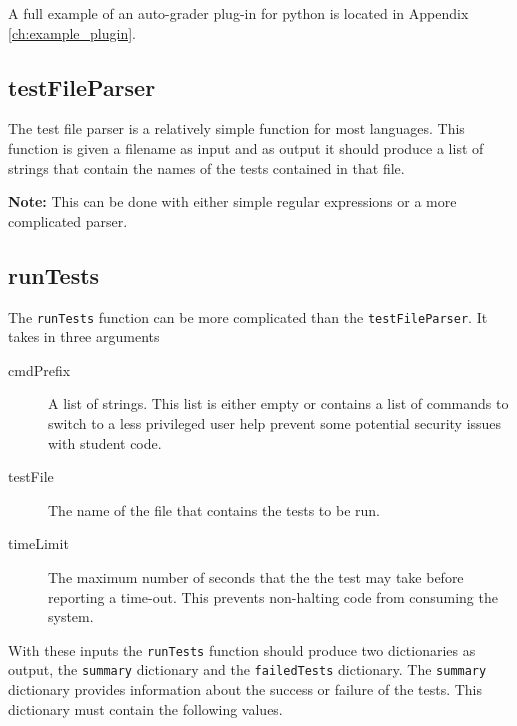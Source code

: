 \documentclass[11pt]{report}
\begin{document}
A full example of an auto-grader plug-in for python is located in 
Appendix \ref{ch:example_plugin}.

\subsection{testFileParser}
The test file parser is a relatively simple function for most languages. This function is given
a filename as input and as output it should produce a list of strings that contain the names 
of the tests contained in that file. 

\noindent\textbf{Note:} This can be done with either simple regular expressions or a more complicated parser.

\subsection{runTests} 

The \texttt{runTests} function can be more complicated than the \texttt{testFileParser}. It takes in
three arguments 
\begin{description}
\item[cmdPrefix] A list of strings. This list is either empty or contains a list of commands to
switch to a less privileged user help prevent some potential security issues with student code.
\item[testFile] The name of the file that contains the tests to be run.
\item[timeLimit] The maximum number of seconds that the the test may take before reporting a 
time-out. This prevents non-halting code from consuming the system.
\end{description}

With these inputs the \texttt{runTests} function should produce two dictionaries as output, the 
\texttt{summary} dictionary and the \texttt{failedTests} dictionary. The \texttt{summary} dictionary
provides information about the success or failure of the tests. This dictionary must contain the following
values. 
\end{document}
